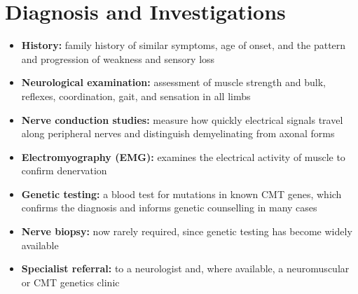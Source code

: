 \section*{Diagnosis and Investigations}
\begin{itemize}
    \item \textbf{History:} family history of similar symptoms, age of onset, and the pattern and progression of weakness and sensory loss
    \item \textbf{Neurological examination:} assessment of muscle strength and bulk, reflexes, coordination, gait, and sensation in all limbs
    \item \textbf{Nerve conduction studies:} measure how quickly electrical signals travel along peripheral nerves and distinguish demyelinating from axonal forms
    \item \textbf{Electromyography (EMG):} examines the electrical activity of muscle to confirm denervation
    \item \textbf{Genetic testing:} a blood test for mutations in known CMT genes, which confirms the diagnosis and informs genetic counselling in many cases
    \item \textbf{Nerve biopsy:} now rarely required, since genetic testing has become widely available
    \item \textbf{Specialist referral:} to a neurologist and, where available, a neuromuscular or CMT genetics clinic
\end{itemize}

